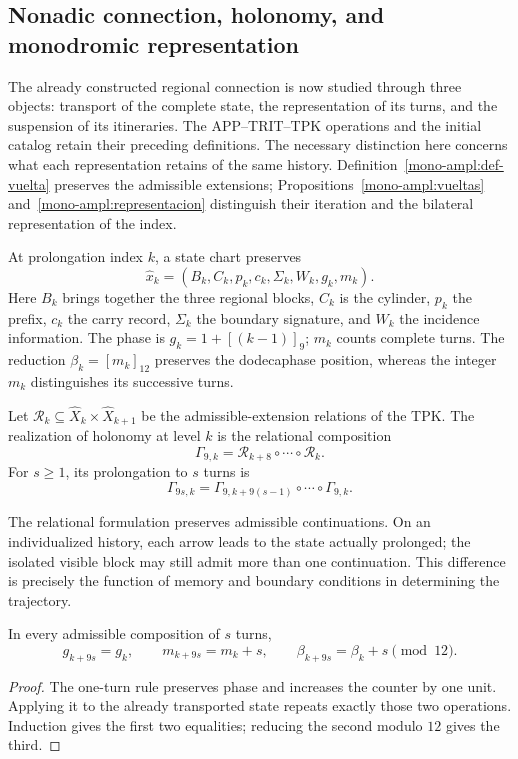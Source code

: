 \subsection{Nonadic connection, holonomy, and monodromic representation}
\label{mono-ampl:conexion}

The already constructed regional connection is now studied through three objects:
transport of the complete state, the representation of its turns, and the
suspension of its itineraries. The APP--TRIT--TPK operations and the
initial catalog retain their preceding definitions. The necessary
distinction here concerns what each representation retains of the
same history. Definition~\ref{mono-ampl:def-vuelta} preserves the admissible
extensions; Propositions~\ref{mono-ampl:vueltas}
and~\ref{mono-ampl:representacion} distinguish their iteration and
the bilateral representation of the index.

At prolongation index \(k\), a state chart preserves
\[
 \widehat x_k=(B_k,C_k,p_k,c_k,\Sigma_k,W_k,g_k,m_k).
\]
Here \(B_k\) brings together the three regional blocks, \(C_k\) is the cylinder,
\(p_k\) the prefix, \(c_k\) the carry record, \(\Sigma_k\) the boundary
signature, and \(W_k\) the incidence information. The phase is
\(g_k=1+[(k-1)]_9\); \(m_k\) counts complete turns. The reduction
\(\beta_k=[m_k]_{12}\) preserves the dodecaphase position, whereas the
integer \(m_k\) distinguishes its successive turns.

\begin{definition}
\label{mono-ampl:def-vuelta}
Let \(\mathcal R_k\subseteq\widehat X_k\times\widehat X_{k+1}\)
be the admissible-extension relations of the TPK. The realization of
holonomy at level \(k\) is the relational composition
\[
 \Gamma_{9,k}=\mathcal R_{k+8}\circ\cdots\circ\mathcal R_k.
\]
For \(s\geq1\), its prolongation to \(s\) turns is
\[
 \Gamma_{9s,k}=
 \Gamma_{9,k+9(s-1)}\circ\cdots\circ\Gamma_{9,k}.
\]
\end{definition}

The relational formulation preserves admissible continuations. On
an individualized history, each arrow leads to the state actually
prolonged; the isolated visible block may still admit more than one
continuation. This difference is precisely the function of memory and
boundary conditions in determining the trajectory.

\begin{proposition}
\label{mono-ampl:vueltas}
In every admissible composition of \(s\) turns,
\[
 g_{k+9s}=g_k,\qquad m_{k+9s}=m_k+s,\qquad
 \beta_{k+9s}=\beta_k+s\pmod{12}.
\]
\end{proposition}
\begin{proof}
The one-turn rule preserves phase and increases the counter by one
unit. Applying it to the already transported state repeats exactly those
two operations. Induction gives the first two equalities; reducing the
second modulo \(12\) gives the third.
\end{proof}

